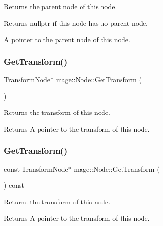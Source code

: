Returns the parent node of this node.

\begin{DoxyReturn}{Returns}
{\ttfamily nullptr} if this node has no parent node. 

A pointer to the parent node of this node. 
\end{DoxyReturn}
\hypertarget{classmage_1_1_node_ab789d7674ed06d3e10114dd6d4b4334c}{}\label{classmage_1_1_node_ab789d7674ed06d3e10114dd6d4b4334c} 
\subsubsection{\texorpdfstring{Get\+Transform()}{GetTransform()}\hspace{0.1cm}{\footnotesize\ttfamily [1/2]}}
{\footnotesize\ttfamily Transform\+Node$\ast$ mage\+::\+Node\+::\+Get\+Transform (\begin{DoxyParamCaption}{ }\end{DoxyParamCaption})\hspace{0.3cm}{\ttfamily [noexcept]}}

Returns the transform of this node.

\begin{DoxyReturn}{Returns}
A pointer to the transform of this node. 
\end{DoxyReturn}
\hypertarget{classmage_1_1_node_acbffccfec34313d8583546204c3d9fda}{}\label{classmage_1_1_node_acbffccfec34313d8583546204c3d9fda} 
\subsubsection{\texorpdfstring{Get\+Transform()}{GetTransform()}\hspace{0.1cm}{\footnotesize\ttfamily [2/2]}}
{\footnotesize\ttfamily const Transform\+Node$\ast$ mage\+::\+Node\+::\+Get\+Transform (\begin{DoxyParamCaption}{ }\end{DoxyParamCaption}) const\hspace{0.3cm}{\ttfamily [noexcept]}}

Returns the transform of this node.

\begin{DoxyReturn}{Returns}
A pointer to the transform of this node. 
\end{DoxyReturn}
\hypertarget{classmage_1_1_node_a1b8c2d933a281f7f815791db38c965ad}{}\label{classmage_1_1_node_a1b8c2d933a281f7f815791db38c965ad} 
